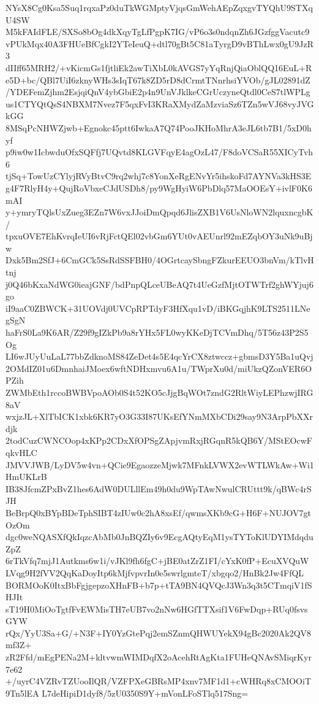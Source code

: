 NYsX8Cg0Ksa5Suq1rqxaPz0duTkWGMptyVjqsGmWehAEpZqxgvTYQhU9STXqU4SW
M5kFAIdFLE/SXSo8bOg4dkXqyTgLfPgpK7IG/vP6o3s0ndqnZh6JGzfggVacutc9
vPUkMqx40A3FHUeBfCgkI2YTeIeuQ+dtl70gBt5C81aTyrgD9vBThLwx0gU9JzR3
dIIff65MRH2/+vKicmGs1fjtliEk2awTiXbL0kAVGS7yYqRnjQiaOblQQ16EuL+R
e5D+bc/QBl7UiI6zknyWHs3sIqT67k8ZD5rD8dCrmtTNnrhsiYVOb/gJL02891dZ
/YDEFemZjhm2EsjqiQnV4ybGbiE2p4n9UnVJklkeCGrUczyneQtdl0CeS7tlWPLg
us1CTYQtQsS4NBXM7Nvez7F5qxFvI3KRaXMydZaMzviaSz6TZn5wVJ68vyJVGkGG
8MSqPcNHWZjwb+Egnokc45ptt6IwkaA7Q74PooJKHoMhrA3eJL6tb7B1/5xD0hyf
p9iw0w1IcbwduOfxSQFfj7UQvtd8KLGVFqyE4agOzL47/F8doVCSaR55XICyTvh6
tjSq+TowUzCYlyjRVyBtvC9rq2whj7c8YonXeRgENvYr5ihskoFd7AYNVa3kHS3E
g4F7RlyH4y+QujRoVbxeCJdUSDh8/py9WgHyiW6PbDlq57MaOOEsY+ivlF0K6mAI
y+ymryTQlsUxZueg3EZn7W6vxJJoiDmQpqd6JlisZXB1V6UsNloWN2lquxncgbK/
tpxuOVE7EhKvrqIeUI6vRjFctQEl02vbGm6YUt0vAEUnrl92mEZqbOY3uNk9uBjw
Dxk5Bm2SfJ+6CmGCk5SsRdSSFBH0/4OGrtcaySbngFZkurEEUO3bnVm/kTlvHtnj
j0Q46bKxaNdWG0ieajGNF/bdPnpQLceUBeAQ7t4UeGzfMjtOTWTrf2ghWYjuj6go
iI9aaC0ZBWCK+31UOVdj0UVCpRPTdyF3HfXqu1vD/iBKGqjhK9LTS2511LNegSgN
haFrS0La9K6AR/Z29f9gIZkPb9a8rYHx5FL0wyKKeDjTCVmDhq/5T56z43P2S5Og
LI6wJUyUuLaL77bbZdknoMS84ZeDet4s5E4qcYrCX8ztwccz+gbmsD3Y5Ba1uQvj
2OMdIZ01u6DmnhaiJMoex6wftNDHxmvu6A1u/TWprXu0d/miUkzQZonVER6OPZih
ZWMbEth1rccoBWBVpoAOb0S4t52KO5cJjgBqWOt7zndG2RltWiyLEPhzwjIRG8aV
wxjzJL+XlTbICK1xbk6KR7yO3G33I87UKsEfYNmMXbCDi29say9N3ArpPbXXrdjk
2todCuzCWNCOop4xKPp2CDxXfOPSgZApjvmRxjRGqnR5kQB6Y/MStEOcwFqkvHLC
JMVVJWB/LyDV5w4vn+QCie9EgaozzeMjwk7MFnkLVWX2evWTLWkAw+Wi1HmUKLrB
IB38JfcmZPxBvZ1hes6AdW0DULllEm49h0du9WpTAwNwulCRUttt9k/qBWc4rSJH
BeBrpQ0xBYpBDeTphSIBT4zIUw0c2hA8xsEf/qwmsXKb9cG+H6F+NUJOV7gtOzOm
dgc0weNQASXfQkIqzcAbMb0JnBQZIy6v9EcgAQtyEqM1ysTYToKlUDYIMdqduZpZ
6rTkVfq7mjJ1Autkms6w1i/vJKl9fh6fgC+jBE0atZrZ1FI/cYxK0fP+EcuXVQuW
LVqg9H2fVV2QqKaDoyItp6kMjfvpvrIn0e5swrlgmteT/xbgqo2/HnBk2Jw4FfQL
BORMOoK0ItxBbFgjgepzoXHnFB+b7p+tTA9BN4QVQcJ3Wn3q3t5CTmqiV1fSHJIt
sT19H0MiOoTgtfFvEWMisTH7eUB7vo2nNw6HGfTTXsif1V6FwDqp+RUq0fsvsGYW
rQx/YyU3Sa+G/+N3F+IY0YzGtePqj2emSZnmQHWUYekX94gBc2020Ak2QV8mf3Z+
zR2Ffd/mEgPENa2M+kltvwmWIMDqfX2oAcehRtAgKta1FUHeQNAvSMiqrKyr7e62
+/uyrC4VZRvTZUooIlQR/VZFPXeGBRsMP4xnv7MF1d1+cWHRq8xCMOOiT9Tn5lEA
L7deHipiD1dyf8/5zU0350S9Y+mVonLFoSTlq517Sng=
